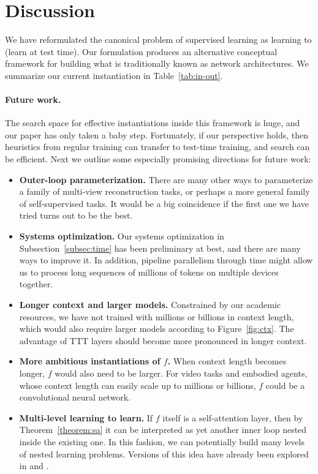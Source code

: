 \documentclass{article}
\begin{document}
\section{Discussion}
We have reformulated the canonical problem of supervised learning as learning to (learn at test time).
Our formulation produces an alternative conceptual framework for building what is traditionally known as network architectures.
We summarize our current instantiation in Table~\ref{tab:in-out}.

\paragraph{Future work.}
The search space for effective instantiations inside this framework is huge, and our paper has only taken a baby step.
Fortunately, if our perspective holds, then heuristics from regular training can transfer to test-time training, and search can be efficient.
Next we outline some especially promising directions for future work:
\begin{itemize}[leftmargin=*]
\item \textbf{Outer-loop parameterization.}
There are many other ways to parameterize a family of multi-view reconstruction tasks, or perhaps a more general family of self-supervised tasks. It would be a big coincidence if the first one we have tried turns out to be the best.
\item \textbf{Systems optimization.} Our systems optimization in Subsection~\ref{subsec:time} has been preliminary at best, and there are many ways to improve it.
In addition, pipeline parallelism through time might allow us to process long sequences of millions of tokens on multiple devices together.
\item \textbf{Longer context and larger models.} Constrained by our academic resources, we have not trained with millions or billions in context length, which would also require larger models according to Figure~\ref{fig:ctx}.
The advantage of TTT layers should become more pronounced in longer context.
\item \textbf{More ambitious instantiations of $f$.}
When context length becomes longer, $f$ would also need to be larger. 
For video tasks and embodied agents, whose context length can easily scale up to millions or billions, $f$ could be a convolutional neural network.
\item \textbf{Multi-level learning to learn.} If $f$ itself is a self-attention layer, then by Theorem~\ref{theorem:sa} it can be interpreted as yet another inner loop nested inside the existing one. 
In this fashion, we can potentially build many levels of nested learning problems.
Versions of this idea have already been explored in \cite{irie2021going} and \cite{irie2022modern}.
\end{itemize}
\end{document}
